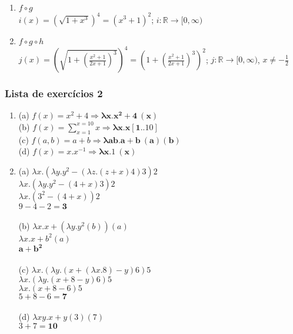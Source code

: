 \documentclass{article}
\begin{document}
\begin{enumerate}
    \begin{enumerate}
        \item $f \circ g$ \\ $i(x) = (\sqrt{1+x^3})^4 = (x^3 + 1)^2$; $i : \mathbb{R} \rightarrow [0, \infty)$
        \item $f \circ g \circ h$ \\ $j(x) = \left(\sqrt{1 + (\frac{x^2 + 1}{2x + 1})^3}\right)^4 = \left(1 + (\frac{x^2 + 1}{2x + 1})^3\right)^2$; $j : \mathbb{R} \rightarrow [0, \infty)$, $x \neq -\frac{1}{2}$
    \end{enumerate}
\end{enumerate}

\subsubsection*{Lista de exercícios 2}
\begin{enumerate}\bfseries
    \item (a) $f(x) = x^2 + 4 \Rightarrow \mathbf{\lambda x.x^2 + 4\ (x)}$ \\
    (b) $f(x) = \sum_{x=1}^{x=10} x \Rightarrow \mathbf{\lambda x.x[1..10]}$ \\
    (c) $f(a, b) = a + b \Rightarrow \mathbf{\lambda ab.a+b\ (a)(b)}$ \\
    (d) $f(x) = x.x^{-1} \Rightarrow \mathbf{\lambda x.1\ (x)}$

    \item (a) $\lambda x.(\lambda y.y^2 - (\lambda z.(z+x)4)3)2$ \\
    $\lambda x.(\lambda y.y^2 - (4+x)3)2$ \\
    $\lambda x.(3^2 - (4+x))2$ \\
    $9 - 4 - 2 = \mathbf{3}$ \\ \\
    (b) $\lambda x.x + (\lambda y.y^2(b))(a)$ \\
    $\lambda x.x + b^2 (a)$ \\
    $\mathbf{a + b^2}$ \\ \\
    (c) $\lambda x.(\lambda y.(x + (\lambda x.8) - y)6)5$ \\
    $\lambda x.(\lambda y.(x + 8 - y)6)5$ \\
    $\lambda x.(x + 8 - 6)5$ \\
    $5 + 8 - 6 = \mathbf{7}$ \\ \\
    (d) $\lambda xy.x + y(3)(7)$ \\
    $3 + 7 = \mathbf{10}$

\end{enumerate}
\end{document}
